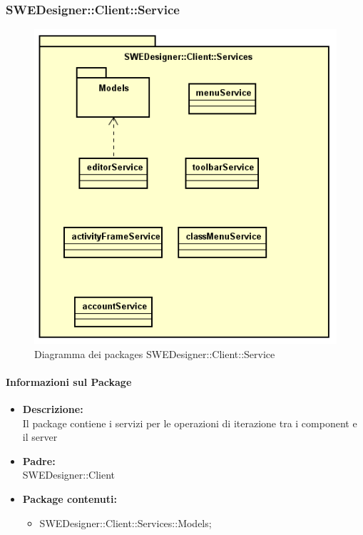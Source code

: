 \begin{itemize}
\subsubsection{SWEDesigner::Client::Service}
		 \begin{figure}[h!]
		\centering
		\includegraphics[scale=0.8]{Disegnetti/SWEDesigner__Client__Services.png}
		\caption{Diagramma dei packages SWEDesigner::Client::Service}
 		\end{figure}
		\paragraph{Informazioni sul Package}
		\begin{itemize}
			\item \textbf{Descrizione: }\\
			Il package contiene i servizi per le operazioni di iterazione tra i component e il server
			\item \textbf{Padre: }\\ SWEDesigner::Client
			\item \textbf{Package contenuti: }
			\begin{itemize}
				\item SWEDesigner::Client::Services::Models;
			\end{itemize}
		\end{itemize}

\end{itemize}
